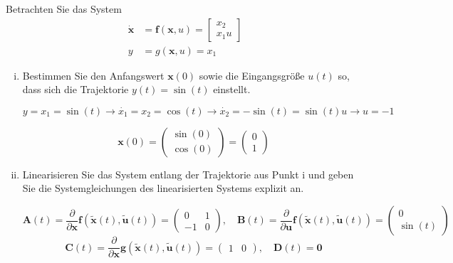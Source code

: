 \documentclass[crop=false]{standalone}
\begin{document}
\begin{task}
Betrachten Sie das System
\[ 
\begin{aligned} \dot{\mathbf{x}} &=\mathbf{f}(\mathbf{x}, u)=\left[\begin{array}{c}{x_{2}} \\ {x_{1} u}\end{array}\right] \\ y &=g(\mathbf{x}, u)=x_{1} \end{aligned}
 \]
 \begin{enumerate}[i.]
     \item Bestimmen Sie den Anfangswert $\mathbf{x}(0)$ sowie die Eingangsgröße $u(t)$ so, dass sich die Trajektorie $y(t)=\sin (t)$ einstellt.
 \begin{solution}
 $y = x_1 = \sin (t) \rightarrow \dot{x_1} = x_2 = \cos (t) \rightarrow \dot{x_2} = - \sin (t) = \sin (t) u \rightarrow u = -1$
 
 \[ \mathbf{x}(0) = \begin{pmatrix} \sin (0) \\ \cos(0) \end{pmatrix} = \begin{pmatrix} 0 \\ 1 \end{pmatrix}\]
    \end{solution}
 \item Linearisieren Sie das System entlang der Trajektorie aus Punkt i und geben Sie die Systemgleichungen des linearisierten Systems explizit an.
 \begin{solution}
 \[ 
\mathbf{A}(t)=\frac{\partial}{\partial \mathbf{x}} \mathbf{f}(\tilde{\mathbf{x}}(t), \tilde{\mathbf{u}}(t)) = \begin{pmatrix} 0 & 1 \\ -1 & 0\end{pmatrix}, \quad
\mathbf{B}(t)=\frac{\partial}{\partial \mathbf{u}} \mathbf{f}(\tilde{\mathbf{x}}(t), \tilde{\mathbf{u}}(t)) = \begin{pmatrix} 0 \\ \sin (t) \end{pmatrix}
 \]
 \[ 
\mathbf{C}(t)=\frac{\partial}{\partial \mathbf{x}} \mathbf{g}(\tilde{\mathbf{x}}(t), \mathbf{\tilde { u }}(t)) = \begin{pmatrix} 1 & 0 \end{pmatrix}, \quad 
\mathbf{D}(t) = \mathbf{0}
 \]
 

\end{solution}
\end{enumerate}
\end{task}
\end{document}
